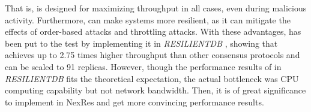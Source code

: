 \par That is, \RCC{} is designed for maximizing throughput in all cases, even during malicious activity. 
Furthermore, \RCC{} can make systems more resilient, as it can mitigate the effects of order-based attacks 
and throttling attacks.
With these advantages, \RCC{} has been put to the test by implementing it in \textit{RESILIENTDB} \cite{gupta2020resilientdb, rahnama2020scalable}, 
showing that \RCC{} achieves up to 2.75 times higher throughput than other consensus protocols and 
can be scaled to 91 replicas. However, though the performance results of \RCC{} in \textit{RESILIENTDB} fits 
the theoretical expectation, the actual bottleneck was CPU computing capability but not network bandwidth. Then, 
it is of great significance to implement \RCC{} in NexRes and get more convincing performance results.